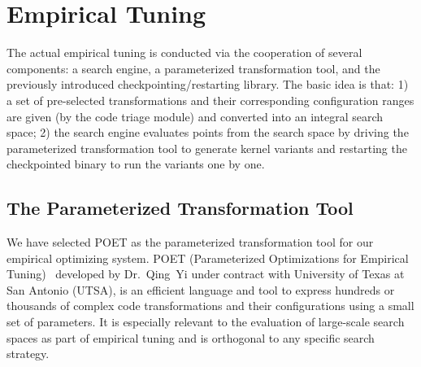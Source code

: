 \section{Empirical Tuning}
The actual empirical tuning is conducted via the cooperation of several
components: a search engine, a parameterized transformation tool, and 
the previously introduced checkpointing/restarting library.
The basic idea is that:
1) a set of pre-selected transformations and their corresponding configuration
   ranges are given (by the code triage module) and converted into an integral
   search space; 
2) the search engine evaluates points from the search space by driving the parameterized
   transformation tool to generate kernel variants and restarting the checkpointed binary
   to run the variants one by one.

\subsection{The Parameterized Transformation Tool}
We have selected POET as the parameterized transformation tool for our empirical
optimizing system. POET (Parameterized Optimizations for Empirical
Tuning)~\cite{YiPOET2007} developed by Dr.~Qing~Yi under contract with University of
Texas at San Antonio (UTSA), is an efficient language and tool to express hundreds or
thousands of complex code transformations and their configurations using a small set
of parameters.  It is especially relevant to the evaluation of large-scale search spaces
as part of empirical tuning and is orthogonal to any specific search strategy.

